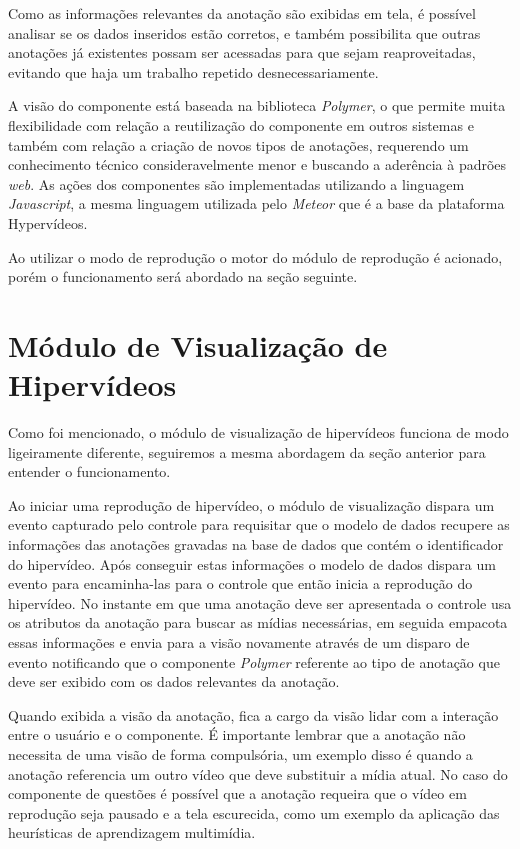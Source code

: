 Como as informações relevantes da anotação são exibidas em tela, é possível analisar se os dados inseridos estão corretos, e também possibilita que outras anotações já existentes possam ser acessadas para que sejam reaproveitadas, evitando que haja um trabalho repetido desnecessariamente.

A visão do componente está baseada na biblioteca \textit{Polymer}, o que permite muita flexibilidade com relação a reutilização do componente em outros sistemas e também com relação a criação de novos tipos de anotações, requerendo um conhecimento técnico consideravelmente menor e buscando a aderência à padrões \textit{web}. As ações dos componentes são implementadas utilizando a linguagem \textit{Javascript}, a mesma linguagem utilizada pelo \textit{Meteor} que é a base da plataforma Hypervídeos.

Ao utilizar o modo de reprodução o motor do módulo de reprodução é acionado, porém o funcionamento será abordado na seção seguinte.

\section{Módulo de Visualização de Hipervídeos}

Como foi mencionado, o módulo de visualização de hipervídeos funciona de modo ligeiramente diferente, seguiremos a mesma abordagem da seção anterior para entender o funcionamento.

Ao iniciar uma reprodução de hipervídeo, o módulo de visualização dispara um evento capturado pelo controle para requisitar que o modelo de dados recupere as informações das anotações gravadas na base de dados que contém o identificador do hipervídeo. Após conseguir estas informações o modelo de dados dispara um evento para encaminha-las para o controle que então inicia a reprodução do hipervídeo. No instante em que uma anotação deve ser apresentada o controle usa os atributos da anotação para buscar as mídias necessárias, em seguida empacota essas informações e envia para a visão novamente através de um disparo de evento notificando que o componente \textit{Polymer} referente ao tipo de anotação que deve ser exibido com os dados relevantes da anotação.

Quando exibida a visão da anotação, fica a cargo da visão lidar com a interação entre o usuário e o componente. É importante lembrar que a anotação não necessita de uma visão de forma compulsória, um exemplo disso é quando a anotação referencia um outro vídeo que deve substituir a mídia atual. No caso do componente de questões é possível que a anotação requeira que o vídeo em reprodução seja pausado e a tela escurecida, como um exemplo da aplicação das heurísticas de aprendizagem multimídia.


